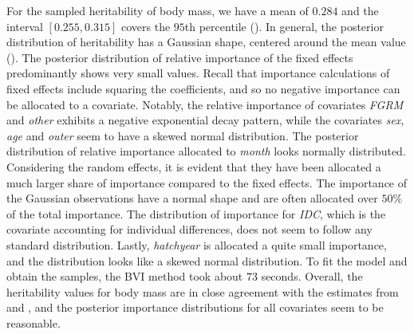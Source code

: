 \noindent For the sampled heritability of body mass, we have a mean of $0.284$ and the interval $[0.255, 0.315]$ covers the $95$th percentile (). In general, the posterior distribution of heritability has a Gaussian shape, centered around the mean value (). The posterior distribution of relative importance of the fixed effects predominantly shows very small values. Recall that importance calculations of fixed effects include squaring the coefficients, and so no negative importance can be allocated to a covariate. Notably, the relative importance of covariates \textit{FGRM} and \textit{other} exhibits a negative exponential decay pattern, while the covariates \textit{sex, age} and \textit{outer} seem to have a skewed normal distribution. The posterior distribution of relative importance allocated to \textit{month} looks normally distributed. Considering the random effects, it is evident that they have been allocated a much larger share of importance compared to the fixed effects. The importance of the Gaussian observations have a normal shape and are often allocated over $50\%$ of the total importance. The distribution of importance for \textit{IDC}, which is the covariate accounting for individual differences, does not seem to follow any standard distribution. Lastly, \textit{hatchyear} is allocated a quite small importance, and the distribution looks like a skewed normal distribution. To fit the model and obtain the samples, the BVI method took about $73$ seconds. Overall, the heritability values for body mass are in close agreement with the estimates from \citet{Silva2017} and \citet{Muff2019Genetic}, and the posterior importance distributions for all covariates seem to be reasonable. 
